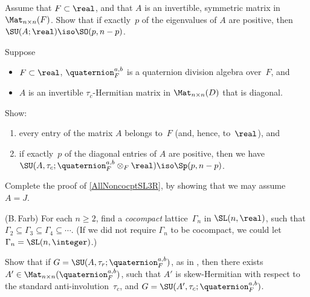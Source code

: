 \begin{exercises}

\item \label{Calcpq(SOAF)}
 Assume that $F \subset \real$, and that $A$ is an invertible, symmetric matrix in $\Mat_{n \times n}(F)$. Show that
if exactly~$p$ of the eigenvalues of $A$ are positive,
then $\SU(A;\real) \iso \SO(p,n-p)$.

\item \label{Calcpq(Sp)}
 Suppose 
 	\begin{itemize}
	\item $F \subset \real$, 
	$\quaternion^{a,b}_F$ is a quaternion division algebra over~$F$, 
	and 
	\item $A$ is an invertible $\tau_c$-Hermitian matrix in $\Mat_{n \times n}(D)$ that is diagonal. 
	\end{itemize}
Show:
	 \begin{enumerate}
	 \item every entry of the matrix $A$ belongs to~$F$ (and, hence, to~$\real$),
	and
	 \item if exactly~$p$ of the diagonal entries of $A$ are positive, then we have $\SU(A, \tau_c; \quaternion^{a,b}_F \otimes_F \real) \iso \Sp(p,n-p)$.
	 \end{enumerate}

\item \label{A=J}
Complete the proof of \cref{AllNoncocptSL3R}, by showing that we may assume $A = J$.

\item (B.\,Farb) 
For each $n \ge 2$, find a \emph{cocompact} lattice~$\Gamma_n$ in $\SL(n,\real)$, such that $\Gamma_2 \subseteq \Gamma_3 \subseteq \Gamma_4 \subseteq \cdots$.  (If we did not require $\Gamma_n$ to be cocompact, we could let $\Gamma_n = \SL(n, \integer)$.)

\item \label{G=SU(skewHerm)}
 Show that if $G = \SU(A,\tau_r;\quaternion^{a,b}_F)$, as in
, then there exists $A' \in \Mat_{n \times n}(\quaternion^{a,b}_F)$, such that $A'$ is  skew-Hermitian with respect to the
standard anti-involution~$\tau_c$, and $G = \SU(A', \tau_c;\quaternion^{a,b}_F)$.


 \end{exercises}



















